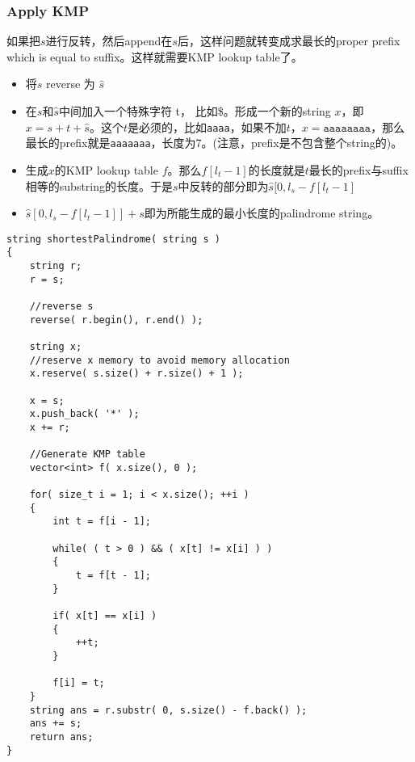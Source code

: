\subsubsection{Apply KMP}
如果把$s$进行反转，然后append在$s$后，这样问题就转变成求最长的proper prefix which is equal to suffix。这样就需要KMP lookup table了。
\begin{itemize}
\item 将$s$ reverse 为 $\hat{s}$
\item 在$s$和$\hat{s}$中间加入一个特殊字符 t， 比如\$。形成一个新的string $x$，即$x=s+t+\hat{s}$。这个$t$是必须的，比如\texttt{aaaa}，如果不加$t$，$x=\texttt{aaaaaaaa}$，那么最长的prefix就是\texttt{aaaaaaa}，长度为7。(注意，prefix是不包含整个string的)。
\item 生成$x$的KMP lookup table $f$。那么$f[l_t-1]$的长度就是$t$最长的prefix与suffix相等的substring的长度。于是$s$中反转的部分即为$\hat{s}[0, l_s-f[l_t-1]$
\item $\hat{s}[0, l_s-f[l_t-1]] + s$即为所能生成的最小长度的palindrome string。
\end{itemize}
\setcounter{lstlisting}{0}
\begin{lstlisting}[style=customc, caption={KMP Table}]
string shortestPalindrome( string s )
{
    string r;
    r = s;

	//reverse s
    reverse( r.begin(), r.end() );

    string x;
    //reserve x memory to avoid memory allocation
    x.reserve( s.size() + r.size() + 1 );

    x = s;
    x.push_back( '*' );
    x += r;

	//Generate KMP table
    vector<int> f( x.size(), 0 );

    for( size_t i = 1; i < x.size(); ++i )
    {
        int t = f[i - 1];

        while( ( t > 0 ) && ( x[t] != x[i] ) )
        {
            t = f[t - 1];
        }

        if( x[t] == x[i] )
        {
            ++t;
        }

        f[i] = t;
    }
    string ans = r.substr( 0, s.size() - f.back() );
    ans += s;
    return ans;
}
\end{lstlisting}
